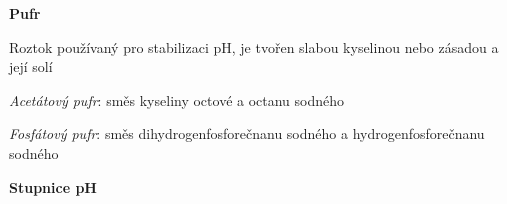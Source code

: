 \documentclass[a4paper]{article}
\begin{document}
{	\textbf{Pufr}
	\begin{compactitem}
		\item Roztok používaný pro stabilizaci pH, je tvořen slabou kyselinou nebo zásadou a její solí
		\item \textit{Acetátový pufr}: směs kyseliny octové a octanu sodného
		\item \textit{Fosfátový pufr}: směs dihydrogenfosforečnanu sodného a hydrogenfosforečnanu sodného
	\end{compactitem}

	\textbf{Stupnice pH}

	\vspace{5mm}

}


\end{document}
